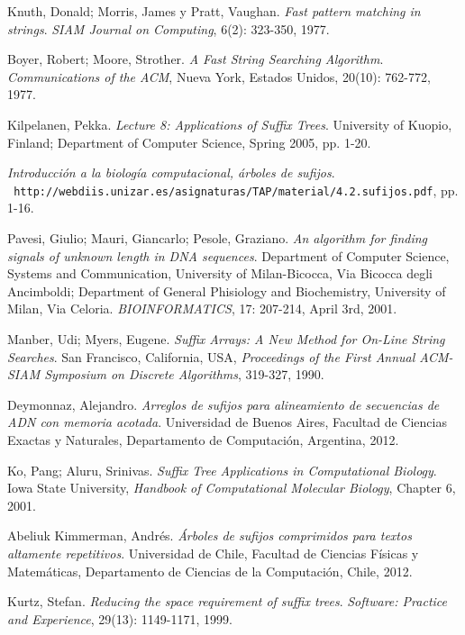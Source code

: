 \documentclass[letterpaper, 10pt, notitlepage]{report}
\begin{document}
\begin{thebibliography}{9}
Knuth, Donald; Morris, James y Pratt, Vaughan.
\textit{Fast pattern matching in strings}.
\textit{SIAM Journal on Computing}, 6(2): 323-350, 1977.

Boyer, Robert; Moore, Strother.
\textit{A Fast String Searching Algorithm}.
\textit{Communications of the ACM}, Nueva York, Estados Unidos, 20(10): 762-772, 1977.

Kilpelanen, Pekka.
\textit{Lecture 8: Applications of Suffix Trees}. 
University of Kuopio, Finland; Department of Computer Science, Spring 2005, pp. 1-20.


\textit{Introducción a la biología computacional, árboles de sufijos}.
\\\texttt{ http://webdiis.unizar.es/asignaturas/TAP/material/4.2.sufijos.pdf}, pp. 1-16.

 
Pavesi, Giulio; Mauri, Giancarlo; Pesole, Graziano.
\textit{An algorithm for finding signals of unknown length in DNA sequences}. 
Department of Computer Science, Systems and Communication, University of Milan-Bicocca, Via Bicocca degli Ancimboldi; Department of General Phisiology and Biochemistry, University of Milan, Via Celoria.
\textit{BIOINFORMATICS}, 17: 207-214, April 3rd, 2001.

Manber, Udi; Myers, Eugene.
\textit{Suffix Arrays: A New Method for On-Line String Searches}. San Francisco, California, USA, 
\textit{Proceedings of the First Annual ACM-SIAM Symposium on Discrete Algorithms}, 319-327, 1990.

Deymonnaz, Alejandro.
\textit{Arreglos de sufijos para alineamiento de secuencias de ADN con memoria acotada}. Universidad de Buenos Aires, Facultad de Ciencias Exactas y Naturales, Departamento de Computación, Argentina, 2012.

Ko, Pang; Aluru, Srinivas.
\textit{Suffix Tree Applications in Computational Biology}. 
Iowa State University, \textit{Handbook of Computational Molecular Biology}, Chapter 6, 2001.

Abeliuk Kimmerman, Andrés.
\textit{Árboles de sufijos comprimidos para textos altamente repetitivos}. Universidad de Chile, Facultad de Ciencias Físicas y Matemáticas, Departamento de Ciencias de la Computación, Chile, 2012.

Kurtz, Stefan.
\textit{Reducing the space requirement of suffix trees}.
\textit{Software: Practice and Experience}, 29(13): 1149-1171, 1999.


\end{thebibliography}
\end{document}
